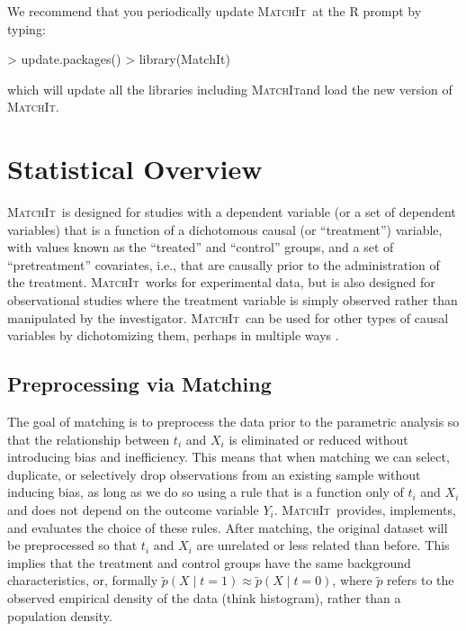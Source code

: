 \documentclass[oneside,letterpaper,titlepage]{article}
\newcommand{\MatchIt}{\textsc{MatchIt}}
\begin{document}
We recommend that you periodically update \MatchIt\ at the R prompt by typing:
\begin{Schunk}
\begin{Sinput}
> update.packages()
> library(MatchIt)
\end{Sinput}
\end{Schunk}
which will update all the libraries including \MatchIt and load the
new version of \MatchIt.


\section{Statistical Overview}

\MatchIt\ is designed for studies with a dependent variable (or a set
of dependent variables) that is a function of a dichotomous causal (or
``treatment'') variable, with values known as the ``treated'' and
``control'' groups, and a set of ``pretreatment'' covariates, i.e.,
that are causally prior to the administration of the treatment.
\MatchIt\ works for experimental data, but is also designed for
observational studies where the treatment variable is simply observed
rather than manipulated by the investigator.  \MatchIt\ can be used
for other types of causal variables by dichotomizing them, perhaps in
multiple ways \citep[see also][]{ImaDyk04}.

\subsection{Preprocessing via Matching}

The goal of matching is to preprocess the data prior to the parametric
analysis so that the relationship between $t_i$ and $X_i$ is
eliminated or reduced without introducing bias and inefficiency.  This
means that when matching we can select, duplicate, or selectively drop
observations from an existing sample without inducing bias, as long as
we do so using a rule that is a function only of $t_i$ and $X_i$ and
does not depend on the outcome variable $Y_i$.  \MatchIt\ provides,
implements, and evaluates the choice of these rules.  After matching,
the original dataset will be preprocessed so that $t_i$ and $X_i$ are
unrelated or less related than before. This implies that the treatment
and control groups have the same background characteristics, or,
formally $\tilde p(X\mid t=1) \approx \tilde p(X\mid t=0)$, where
$\tilde p$ refers to the observed empirical density of the data (think
histogram), rather than a population density.
\end{document}
